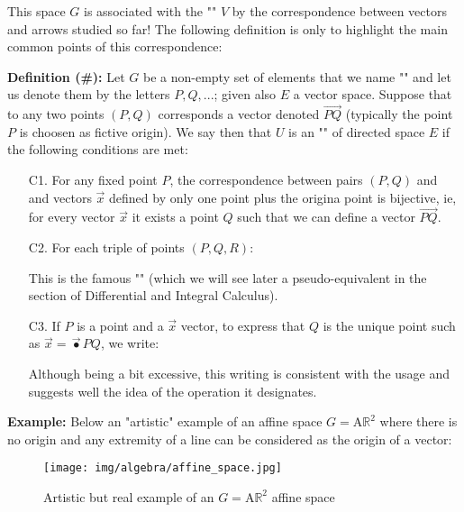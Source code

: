 	This space $G$ is associated with the "" $V$ by the correspondence between vectors and arrows studied so far! The following definition is only to highlight the main common points of this correspondence:
	
	\textbf{Definition (\#\mydef):} Let $G$ be a non-empty set of elements that we name "" and let us  denote them by the letters $P, Q, ...$; given also $E$ a vector space. Suppose that to any two points $(P, Q)$ corresponds a vector denoted $\overrightarrow{PQ}$ (typically the point $P$ is choosen as fictive origin). We say then that $U$ is an "" of directed space $E$ if the following conditions are met:
	\begin{enumerate}
		\item[C1.] For any fixed point $P$, the correspondence between pairs $(P, Q)$ and and vectors $\vec{x}$ defined by only one point plus the origina point is bijective, ie, for every vector $\vec{x}$ it exists a point $Q$ such that we can define a vector $\overrightarrow{PQ}$.
		
		\item[C2.] For each triple of points $(P, Q, R)$:
		
		This is the famous "" (which we will see later a pseudo-equivalent in the section of Differential and Integral Calculus).
		
		\item[C3.] If $P$ is a point and a $\vec{x}$ vector, to express that $Q$ is the unique point such as $\vec{x}=\overrightarrow{•}{PQ}$, we write:
		
		Although being a bit excessive, this writing is consistent with the usage and suggests well the idea of the operation it designates.
	\end{enumerate}
	\begin{tcolorbox}[colframe=black,colback=white,sharp corners]
	\textbf{{\Large {}}Example:}
	Below an "artistic" example of an affine space $G=\text{A}\mathbb{R}^2$ where there is no origin and any extremity of a line can be considered as the origin of a vector:
	\begin{figure}[H]
		\centering
		\texttt{[image: img/algebra/affine\_space.jpg]}
		\caption{Artistic but real example of an $G=\text{A}\mathbb{R}^2$ affine space}
	\end{figure}
	\end{tcolorbox}
	

